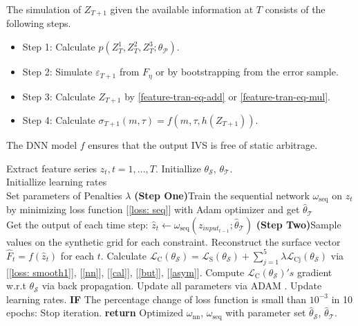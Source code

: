 \documentclass[11pt,a4paper]{article}
\theoremstyle{remark}
\begin{document}
The simulation of $Z_{T+1}$ given the available information at $T$ consists of the following steps. 
\begin{itemize}
	\item Step 1: Calculate $p(Z^1_T,Z^2_T,Z^3_T;\theta_\mathcal{P})$. 
	
	\item Step 2: Simulate $\varepsilon_{T+1}$ from $F_{\eta}$ or by bootstrapping from the error sample. 
	
	\item Step 3: Calculate $Z_{T+1}$ by \eqref{feature-tran-eq-add} or \eqref{feature-tran-eq-mul}.
	
	\item Step 4: Calculate $\sigma_{T+1}(m,\tau)=f(m,\tau,h(Z_{T+1}))$.
\end{itemize}
The DNN model $f$ ensures that the output IVS is free of static arbitrage. 



\iffalse
\begin{algorithm}[h!]
\caption{Two-Step Training}
\label{alg:algorithm}
\begin{algorithmic}[1]
\STATE Extract feature series $z_{t}, t = 1,...,T$.
\STATE Initiallize $\theta_{\mathcal{S}}$, $\theta_{\mathcal{T}}$. \\
\STATE Initiallize learning rates\\
\STATE Set parameters of Penalties $\lambda$
\STATE \textbf{(Step One)}Train the sequential network $\omega_{\mathrm{seq}}$ on $z_{t}$ by minimizing loss function [\ref{loss: seq}] with Adam optimizer and get $\hat{\theta}_{\mathcal{T}}$\\
\STATE Get the output of each time step:
\label{code:recentStart}
\STATE $\hat{z}_t\xleftarrow{}\omega_{\mathrm{seq}}\left(z_{input_{t-1}};\hat{\theta}_{\mathcal{T}}\right)$
\ENDFOR
\STATE \textbf{(Step Two)}Sample values on the synthetic grid for each constraint.
\STATE Reconstruct the surface vector $\hat{F}_{t} = f(\hat{z}_{t})$ for each $t$.
\STATE Calculate $\mathcal{L}_{\mathrm{C}}(\theta_{\mathcal{S}})=\mathcal{L}_{\mathrm{S}}(\theta_{\mathcal{S}})+\sum_{j=1}^{5} \lambda \mathcal{L}_{\mathrm{Cj}}(\theta_{\mathcal{S}})$ via [\ref{loss: smooth1}], [\ref{nn}], [\ref{cal}], [\ref{but}], [\ref{asym}].
\STATE Compute $\mathcal{L}_{\mathrm{C}}(\theta_{\mathcal{S}})'s$ gradient w.r.t $\theta_{\mathcal{S}}$ via back propagation.
\STATE Update all parameters via ADAM \cite{kingma2014adam}.
\STATE Update learning rates.
\STATE \textbf{IF} The percentage change of loss function is small than $10^{-3}$ in 10 epochs: Stop iteration.
\ENDFOR
\label{code:recentEnd}
\STATE \textbf{return} Optimized $\omega_{\mathrm{nn}}$, $\omega_{\mathrm{seq}}$ with parameter set $\hat{\theta}_{\mathcal{S}}$, $\hat{\theta}_{\mathcal{T}}$.
\end{algorithmic}
\end{algorithm}
\end{document}
